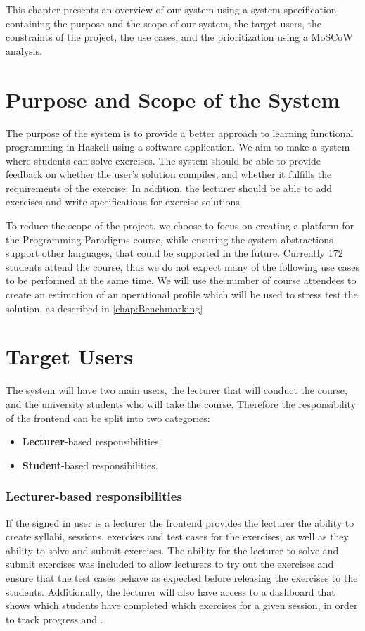 This chapter presents an overview of our system using a system specification containing the purpose and the scope of our system, the target users, the constraints of the project, the use cases, and the prioritization using a MoSCoW analysis.

\section*{Purpose and Scope of the System}
The purpose of the system is to provide a better approach to learning functional programming in Haskell using a software application.
We aim to make a system where students can solve exercises. The system should be able to provide feedback on whether the user's solution compiles, and whether it fulfills the requirements of the exercise.
In addition, the lecturer should be able to add exercises and write specifications for exercise solutions.

To reduce the scope of the project, we choose to focus on creating a platform for the Programming Paradigms course, while ensuring the system abstractions support other languages, that could be supported in the future.
Currently 172 students attend the course, thus we do not expect many of the following use cases to be performed at the same time.
We will use the number of course attendees to create an estimation of an operational profile which will be used to stress test the solution, as described in \ref{chap:Benchmarking}

\section*{Target Users}
The system will have two main users, the lecturer that will conduct the course, and the university students who will take the course.
Therefore the responsibility of the frontend can be split into two categories:
\begin{itemize}
    \item \textbf{Lecturer}-based responsibilities.
    \item \textbf{Student}-based responsibilities.
\end{itemize}

\subsubsection*{Lecturer-based responsibilities}
If the signed in user is a lecturer the frontend provides the lecturer the ability to create syllabi, sessions, exercises and test cases for the exercises, as well as they ability to solve and submit exercises. The ability for the lecturer to solve and submit exercises was included to allow lecturers to try out the exercises and ensure that the test cases behave as expected before releasing the exercises to the students. Additionally, the lecturer will also have access to a dashboard that shows which students have completed which exercises for a given session, in order to track progress and .

